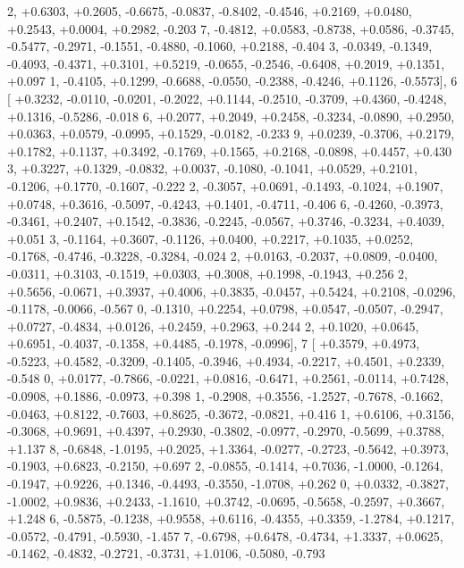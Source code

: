 \begin{DoxyCode}
      2, +0.6303, +0.2605, -0.6675, -0.0837, -0.8402, -0.4546, +0.2169, +0.0480, +0.2543, +0.0004, +0.2982, -0.203
      7, -0.4812, +0.0583, -0.8738, +0.0586, -0.3745, -0.5477, -0.2971, -0.1551, -0.4880, -0.1060, +0.2188, -0.404
      3, -0.0349, -0.1349, -0.4093, -0.4371, +0.3101, +0.5219, -0.0655, -0.2546, -0.6408, +0.2019, +0.1351, +0.097
      1, -0.4105, +0.1299, -0.6688, -0.0550, -0.2388, -0.4246, +0.1126, -0.5573],
6 [ +0.3232, -0.0110, -0.0201, -0.2022, +0.1144, -0.2510, -0.3709, +0.4360, -0.4248, +0.1316, -0.5286, -0.018
      6, +0.2077, +0.2049, +0.2458, -0.3234, -0.0890, +0.2950, +0.0363, +0.0579, -0.0995, +0.1529, -0.0182, -0.233
      9, +0.0239, -0.3706, +0.2179, +0.1782, +0.1137, +0.3492, -0.1769, +0.1565, +0.2168, -0.0898, +0.4457, +0.430
      3, +0.3227, +0.1329, -0.0832, +0.0037, -0.1080, -0.1041, +0.0529, +0.2101, -0.1206, +0.1770, -0.1607, -0.222
      2, -0.3057, +0.0691, -0.1493, -0.1024, +0.1907, +0.0748, +0.3616, -0.5097, -0.4243, +0.1401, -0.4711, -0.406
      6, -0.4260, -0.3973, -0.3461, +0.2407, +0.1542, -0.3836, -0.2245, -0.0567, +0.3746, -0.3234, +0.4039, +0.051
      3, -0.1164, +0.3607, -0.1126, +0.0400, +0.2217, +0.1035, +0.0252, -0.1768, -0.4746, -0.3228, -0.3284, -0.024
      2, +0.0163, -0.2037, +0.0809, -0.0400, -0.0311, +0.3103, -0.1519, +0.0303, +0.3008, +0.1998, -0.1943, +0.256
      2, +0.5656, -0.0671, +0.3937, +0.4006, +0.3835, -0.0457, +0.5424, +0.2108, -0.0296, -0.1178, -0.0066, -0.567
      0, -0.1310, +0.2254, +0.0798, +0.0547, -0.0507, -0.2947, +0.0727, -0.4834, +0.0126, +0.2459, +0.2963, +0.244
      2, +0.1020, +0.0645, +0.6951, -0.4037, -0.1358, +0.4485, -0.1978, -0.0996],
7 [ +0.3579, +0.4973, -0.5223, +0.4582, -0.3209, -0.1405, -0.3946, +0.4934, -0.2217, +0.4501, +0.2339, -0.548
      0, +0.0177, -0.7866, -0.0221, +0.0816, -0.6471, +0.2561, -0.0114, +0.7428, -0.0908, +0.1886, -0.0973, +0.398
      1, -0.2908, +0.3556, -1.2527, -0.7678, -0.1662, -0.0463, +0.8122, -0.7603, +0.8625, -0.3672, -0.0821, +0.416
      1, +0.6106, +0.3156, -0.3068, +0.9691, +0.4397, +0.2930, -0.3802, -0.0977, -0.2970, -0.5699, +0.3788, +1.137
      8, -0.6848, -1.0195, +0.2025, +1.3364, -0.0277, -0.2723, -0.5642, +0.3973, -0.1903, +0.6823, -0.2150, +0.697
      2, -0.0855, -0.1414, +0.7036, -1.0000, -0.1264, -0.1947, +0.9226, +0.1346, -0.4493, -0.3550, -1.0708, +0.262
      0, +0.0332, -0.3827, -1.0002, +0.9836, +0.2433, -1.1610, +0.3742, -0.0695, -0.5658, -0.2597, +0.3667, +1.248
      6, -0.5875, -0.1238, +0.9558, +0.6116, -0.4355, +0.3359, -1.2784, +0.1217, -0.0572, -0.4791, -0.5930, -1.457
      7, -0.6798, +0.6478, -0.4734, +1.3337, +0.0625, -0.1462, -0.4832, -0.2721, -0.3731, +1.0106, -0.5080, -0.793

\end{DoxyCode}
